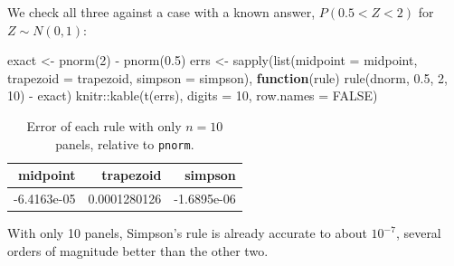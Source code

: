 \documentclass[
  letterpaper,
  DIV=11,
  numbers=noendperiod]{scrreprt}
\newenvironment{Shaded}{\begin{snugshade}}{\end{snugshade}}
\newcommand{\AttributeTok}[1]{\textcolor[rgb]{0.40,0.45,0.13}{#1}}
\newcommand{\ConstantTok}[1]{\textcolor[rgb]{0.56,0.35,0.01}{#1}}
\newcommand{\ControlFlowTok}[1]{\textcolor[rgb]{0.00,0.23,0.31}{\textbf{#1}}}
\newcommand{\DecValTok}[1]{\textcolor[rgb]{0.68,0.00,0.00}{#1}}
\newcommand{\FloatTok}[1]{\textcolor[rgb]{0.68,0.00,0.00}{#1}}
\newcommand{\FunctionTok}[1]{\textcolor[rgb]{0.28,0.35,0.67}{#1}}
\newcommand{\NormalTok}[1]{\textcolor[rgb]{0.00,0.23,0.31}{#1}}
\newcommand{\OtherTok}[1]{\textcolor[rgb]{0.00,0.23,0.31}{#1}}
\newcommand{\SpecialCharTok}[1]{\textcolor[rgb]{0.37,0.37,0.37}{#1}}
\begin{document}
We check all three against a case with a known answer,
\(P(0.5 < Z < 2)\) for \(Z \sim N(0,1)\):

\begin{Shaded}
\begin{Highlighting}[]
\NormalTok{exact }\OtherTok{\textless{}{-}} \FunctionTok{pnorm}\NormalTok{(}\DecValTok{2}\NormalTok{) }\SpecialCharTok{{-}} \FunctionTok{pnorm}\NormalTok{(}\FloatTok{0.5}\NormalTok{)}
\NormalTok{errs }\OtherTok{\textless{}{-}} \FunctionTok{sapply}\NormalTok{(}\FunctionTok{list}\NormalTok{(}\AttributeTok{midpoint =}\NormalTok{ midpoint, }\AttributeTok{trapezoid =}\NormalTok{ trapezoid, }\AttributeTok{simpson =}\NormalTok{ simpson),}
               \ControlFlowTok{function}\NormalTok{(rule) }\FunctionTok{rule}\NormalTok{(dnorm, }\FloatTok{0.5}\NormalTok{, }\DecValTok{2}\NormalTok{, }\DecValTok{10}\NormalTok{) }\SpecialCharTok{{-}}\NormalTok{ exact)}
\NormalTok{knitr}\SpecialCharTok{::}\FunctionTok{kable}\NormalTok{(}\FunctionTok{t}\NormalTok{(errs), }\AttributeTok{digits =} \DecValTok{10}\NormalTok{, }\AttributeTok{row.names =} \ConstantTok{FALSE}\NormalTok{)}
\end{Highlighting}
\end{Shaded}

{

\begin{longtable}[]{@{}rrr@{}}

\caption{\label{tbl-rules-accuracy}Error of each rule with only \(n=10\)
panels, relative to \texttt{pnorm}.}

\tabularnewline

\toprule\noalign{}
midpoint & trapezoid & simpson \\
\midrule\noalign{}
\endhead
\bottomrule\noalign{}
\endlastfoot
-6.4163e-05 & 0.0001280126 & -1.6895e-06 \\

\end{longtable}

}

With only 10 panels, Simpson's rule is already accurate to about
\(10^{-7}\), several orders of magnitude better than the other two.
\end{document}
